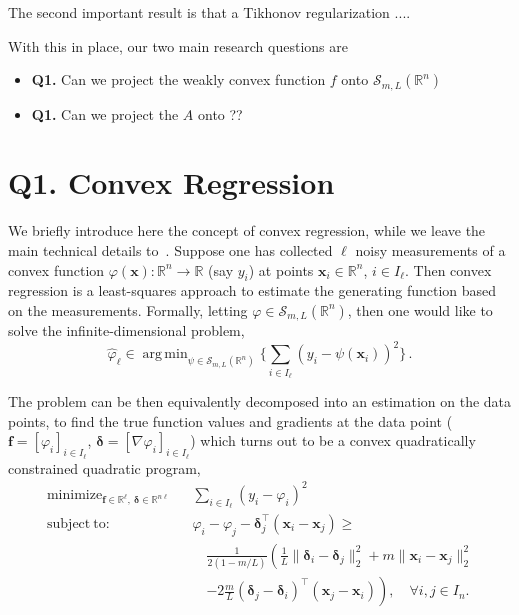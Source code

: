 \documentclass{article}
\DeclareMathOperator*{\argmin}{arg\,min}
\DeclareMathOperator*{\minimize}{minimize}
\newcommand{\R}{\mathbb{R}}
\newcommand{\f}{\mathbold{f}}
\newcommand{\bdelta}{\mathbold{\delta}}
\newcommand{\transp}{\top}
\newcommand{\x}{\mathbold{x}}
\begin{document}
The second important result is that a Tikhonov regularization $..$..


With this in place, our two main research questions are
\begin{itemize}
\item {\bf Q1.} Can we project the weakly convex function $f$ onto $\mathcal{S}_{m,L}(\R^n)$

\item {\bf Q1.} Can we project the $A$ onto ??

\end{itemize}

\section{Q1. Convex Regression}

We briefly introduce here the concept of convex regression, while we leave the main technical details to~\cite{1,2,3}. Suppose one has collected $\ell$ noisy measurements of a convex function $\varphi(\x): \R^n \to \R$ (say $y_i$) at points $\x_i \in \R^n$, $i \in I_{\ell}$. Then convex regression is a least-squares approach to estimate the generating function based on the measurements. Formally, letting $\varphi \in \mathcal{S}_{m,L}(\R^n)$, then one would like to solve the infinite-dimensional problem, 
\begin{equation}\label{eq.inf}
\hat{\varphi}_{\ell} \in \argmin_{\psi \in \mathcal{S}_{m, L}(\R^n)}\Big\{ \sum_{i\in I_{\ell}} (y_i - \psi(\x_i))^2 \Big\} \,.
\end{equation}

The problem can be then equivalently decomposed into an estimation on the data points, to find the true function values and gradients at the data point ($\f = [\varphi_i]_{i \in I_{\ell}}$, $\bdelta = [\nabla \varphi_i]_{i \in I_{\ell}}$) which turns out to be a convex quadratically constrained quadratic program, 
\begin{subequations}\label{socp}
\begin{eqnarray}
\minimize_{\f\in\R^\ell\!,~ \bdelta \in\R^{n\ell}} && \sum_{i\in I_{\ell}} (y_i - \varphi_i)^2 \\
\mathrm{subject~to:} &&
\varphi_i - \varphi_j - \bdelta_j^\transp (\x_i - \x_j) \geq \\ && \quad \frac{1}{2(1 - m/L)}\left(\frac{1}{L}\|\bdelta_i - \bdelta_j \|^2_2 + m \|\x_i - \x_j\|_2^2 \right. \nonumber \\ && \quad \left. - 2 \frac{m}{L} (\bdelta_j-\bdelta_i)^\transp (\x_j - \x_i) \right), \quad \forall i, j \in I_n. \nonumber
\end{eqnarray} 
\end{subequations}
\end{document}
